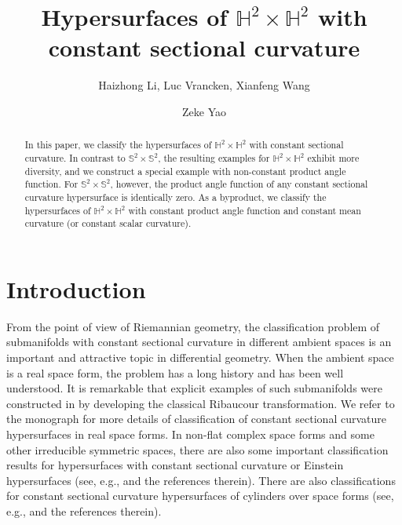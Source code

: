 \documentclass[reqno]{amsart}%
\title[Hypersurfaces of $\mathbb{H}^2\times\mathbb{H}^2$ with constant sectional curvature]
{Hypersurfaces of $\mathbb{H}^2\times\mathbb{H}^2$ with constant sectional curvature}
\author{Haizhong Li, Luc Vrancken, Xianfeng Wang \and Zeke Yao}
\date{}
\theoremstyle{definition}
\numberwithin{equation}{section}
\begin{document}
\begin{abstract}
In this paper, we classify the hypersurfaces
of $\mathbb{H}^2\times\mathbb{H}^2$ with constant sectional curvature. 
In contrast to $\mathbb{S}^2\times\mathbb{S}^2$, the resulting examples for $\mathbb{H}^2\times\mathbb{H}^2$  exhibit more diversity, and we construct a special  example with non-constant product angle function. For  $\mathbb{S}^2\times\mathbb{S}^2$, however, the product angle function of any constant sectional curvature  hypersurface is identically zero. 
As a byproduct, we classify the hypersurfaces of  $\mathbb{H}^2\times\mathbb{H}^2$ with constant product angle function and constant mean curvature (or constant scalar curvature).
\end{abstract}

\maketitle

\section{Introduction}\label{sect:1}


From the point of view of Riemannian geometry, the  classification problem of submanifolds with constant sectional curvature in different ambient spaces is an important and  attractive topic in differential geometry. 
When the ambient space is a real space form, the problem has a long history and has been well understood. It is remarkable that explicit examples of such 
submanifolds were constructed in \cite{DT2002} by  developing the classical Ribaucour transformation. We refer to the monograph \cite{DT2019} for more details of classification of  constant sectional curvature hypersurfaces in real space forms. 
In non-flat complex space forms and some other irreducible symmetric spaces, there are also some important classification results for hypersurfaces with constant sectional curvature or Einstein hypersurfaces (see, e.g.,  \cite{CR1982,I-R,K-R,Kon,M,N-P} and the references therein).
There are also classifications for constant sectional curvature  hypersurfaces of cylinders over space forms 
(see, e.g., \cite{AEG,CT2025,M-T} and the references  therein). 
\end{document}
